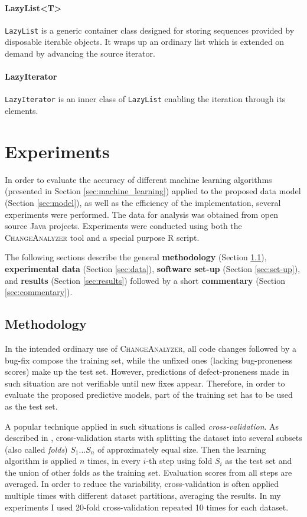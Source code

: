\documentclass{pracamgr}
\newcommand{\ca}{\textsc{ChangeAnalyzer}\xspace}
\begin{document}
\subsubsection*{LazyList<T>}
\texttt{LazyList} is a generic container class designed for storing sequences provided by disposable iterable objects. It wraps up an ordinary list which is extended on demand by advancing the source iterator.

\subsubsection*{LazyIterator}
\texttt{LazyIterator} is an inner class of \texttt{LazyList} enabling the iteration through its elements.

\chapter{Experiments}
\label{cha:experiments}
In order to evaluate the accuracy of different machine learning algorithms (presented in Section \ref{sec:machine_learning}) applied to the proposed data model (Section \ref{sec:model}), as well as the efficiency of the implementation, several experiments were performed. The data for analysis was obtained from open source Java projects. Experiments were conducted using both the \ca tool and a special purpose R script.

The following sections describe the general \textbf{methodology} (Section \ref{sec:methodology}), \textbf{experimental data} (Section \ref{sec:data}), \textbf{software set-up} (Section \ref{sec:set-up}), and \textbf{results} (Section \ref{sec:results}) followed by a short \textbf{commentary} (Section \ref{sec:commentary}).

\section{Methodology}
\label{sec:methodology}
In the intended ordinary use of \ca, all code changes followed by a bug-fix compose the training set, while the unfixed ones (lacking bug-proneness scores) make up the test set. However, predictions of defect-proneness made in such situation are not verifiable until new fixes appear. Therefore, in order to evaluate the proposed predictive models, part of the training set has to be used as the test set.

A popular technique applied in such situations is called \emph{cross-validation}. As described in \cite[p. 249]{encyclopedia}, cross-validation starts with splitting the dataset into several subsets (also called \emph{folds}) $S_1 ... S_n$ of approximately equal size. Then the learning algorithm is applied $n$ times, in every $i$-th step using fold $S_i$ as the test set and the union of other folds as the training set. Evaluation scores from all steps are averaged. In order to reduce the variability, cross-validation is often applied multiple times with different dataset partitions, averaging the results. In my experiments I used 20-fold cross-validation repeated 10 times for each dataset.
\end{document}
